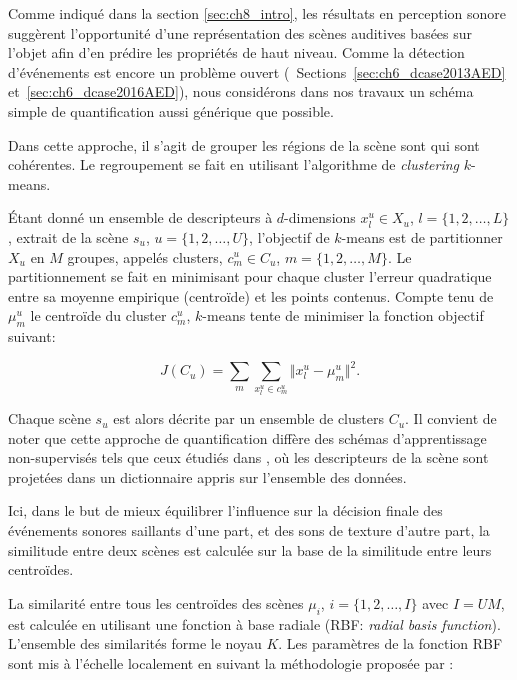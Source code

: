 Comme indiqué dans la section \ref{sec:ch8_intro}, les résultats en perception sonore suggèrent l'opportunité d'une représentation des scènes auditives basées sur l'objet afin d'en prédire les propriétés de haut niveau. Comme la détection d'événements est encore un problème ouvert (\cf~Sections~\ref{sec:ch6_dcase2013AED} et~\ref{sec:ch6_dcase2016AED}), nous considérons dans nos travaux un schéma simple de quantification aussi générique que possible. 

Dans cette approche, il s'agit de grouper les régions de la scène sont qui sont cohérentes. Le regroupement se fait en utilisant l'algorithme de \emph{clustering} $k$-means.

Étant donné un ensemble de descripteurs à $d$-dimensions $x_l^u\in X_u$, $l=\lbrace 1,2,\ldots,L\rbrace$, extrait de la scène  $s_u$, $u=\lbrace 1,2,\ldots,U\rbrace$, l'objectif de $k$-means est de partitionner $X_u$ en $M$ groupes, appelés clusters, $c^u_m\in C_u$, $m=\lbrace 1,2,\ldots,M\rbrace$. Le partitionnement se fait en minimisant pour chaque cluster l'erreur quadratique entre sa moyenne empirique (centroïde) et les points contenus. Compte tenu de $\mu_m^u$ le centroïde du cluster $c_m^u$, $k$-means tente de minimiser la fonction objectif suivant:

\begin{equation}
J(C_u)=\sum\limits_{m} \sum_{x^u_l\in c^u_m} \Vert x_l^u - \mu_m^u \Vert^2\mbox{.}
\end{equation}

Chaque scène $s_u$ est alors décrite par un ensemble de clusters $C_u$. Il convient de noter que cette approche de quantification diffère des schémas d'apprentissage non-supervisés tels que ceux étudiés dans \cite{bisot2016acoustic}, où les descripteurs de la scène sont projetées dans un dictionnaire appris sur l'ensemble des données.

Ici, dans le but de mieux équilibrer l'influence sur la décision finale des événements sonores saillants d'une part, et des sons de texture d'autre part, la similitude entre deux scènes est calculée sur la base de la similitude entre leurs centroïdes.

La similarité entre tous les centroïdes des scènes $\mu_i$, $i=\lbrace1,2,\ldots,I \rbrace$ avec $I=UM$, est calculée en utilisant une fonction à base radiale (RBF: \emph{radial basis function}). L'ensemble des similarités forme le noyau $K$. Les paramètres de la fonction RBF sont mis à l'échelle localement en suivant la méthodologie proposée par \citep{selfTuneManor2004}:

